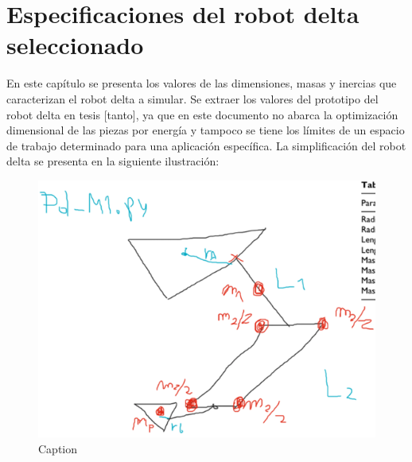 \chapter{Especificaciones del robot delta seleccionado}\label{CAP5}
En este capítulo se presenta los valores de las dimensiones, masas y inercias que caracterizan el robot delta a simular. Se extraer los valores del prototipo del robot delta en tesis [tanto], ya que en este documento no abarca la optimización dimensional de las piezas por energía y tampoco se tiene los límites de un espacio de trabajo determinado para una aplicación específica. La simplificación del robot delta se presenta en la siguiente ilustración:

    \begin{figure}[htb]
        \centering
        \includegraphics[width=0.8\linewidth]{Main/Chapter5/Images5/cap5_1.png}
        \caption{Caption}
        \label{fig:cap5_1}
    \end{figure}

    \begingroup
    
